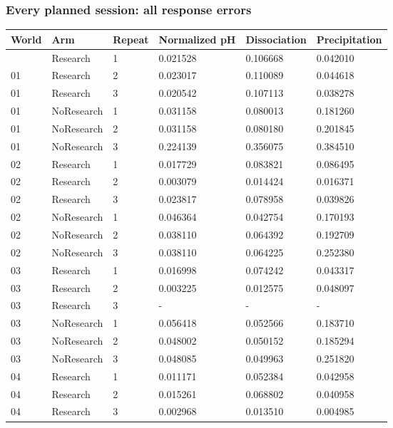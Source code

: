 \documentclass[10pt,a4paper]{article}
\begin{document}
\subsubsection{Every planned session: all response errors}\label{every-planned-session-all-response-errors}

{\def\LTcaptype{table} %
\small\begin{longtable}[]{@{}llllll@{}}
\toprule\noalign{}
World & Arm & Repeat & Normalized pH & Dissociation & Precipitation \\
\midrule\noalign{}
\endhead
\bottomrule\noalign{}
\endlastfoot
01 & Research & 1 & 0.021528 & 0.106668 & 0.042010 \\
01 & Research & 2 & 0.023017 & 0.110089 & 0.044618 \\
01 & Research & 3 & 0.020542 & 0.107113 & 0.038278 \\
01 & NoResearch & 1 & 0.031158 & 0.080013 & 0.181260 \\
01 & NoResearch & 2 & 0.031158 & 0.080180 & 0.201845 \\
01 & NoResearch & 3 & 0.224139 & 0.356075 & 0.384510 \\
02 & Research & 1 & 0.017729 & 0.083821 & 0.086495 \\
02 & Research & 2 & 0.003079 & 0.014424 & 0.016371 \\
02 & Research & 3 & 0.023817 & 0.078958 & 0.039826 \\
02 & NoResearch & 1 & 0.046364 & 0.042754 & 0.170193 \\
02 & NoResearch & 2 & 0.038110 & 0.064392 & 0.192709 \\
02 & NoResearch & 3 & 0.038110 & 0.064225 & 0.252380 \\
03 & Research & 1 & 0.016998 & 0.074242 & 0.043317 \\
03 & Research & 2 & 0.003225 & 0.012575 & 0.048097 \\
03 & Research & 3 & - & - & - \\
03 & NoResearch & 1 & 0.056418 & 0.052566 & 0.183710 \\
03 & NoResearch & 2 & 0.048002 & 0.050152 & 0.185294 \\
03 & NoResearch & 3 & 0.048085 & 0.049963 & 0.251820 \\
04 & Research & 1 & 0.011171 & 0.052384 & 0.042958 \\
04 & Research & 2 & 0.015261 & 0.068802 & 0.040958 \\
04 & Research & 3 & 0.002968 & 0.013510 & 0.004985 \\

\end{longtable}}
\end{document}
